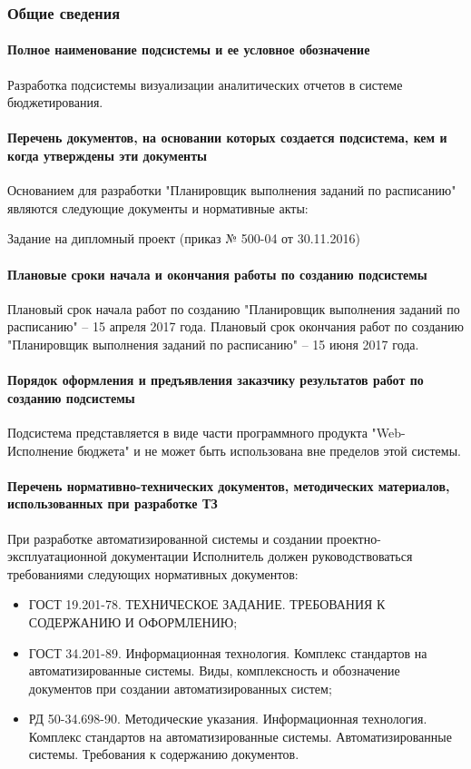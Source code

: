 \documentclass[a4paper]{extarticle}
\numberwithin{equation}{section}
\begin{document}
\subsubsection{Общие сведения}

\paragraph{Полное наименование подсистемы и ее условное обозначение}
Разработка подсистемы визуализации аналитических отчетов в системе бюджетирования.

\paragraph{Перечень документов, на основании которых создается подсистема, кем и когда утверждены эти документы}
Основанием для разработки "Планировщик выполнения заданий по расписанию" являются следующие документы и нормативные акты:\par
Задание на дипломный проект (приказ № 500-04 от 30.11.2016)

\paragraph{Плановые сроки начала и окончания работы по созданию подсистемы}
Плановый срок начала работ по созданию "Планировщик выполнения заданий по расписанию" – 15 апреля 2017 года. Плановый срок окончания работ по созданию "Планировщик выполнения заданий по расписанию" – 15 июня 2017 года.

\paragraph{Порядок оформления и предъявления заказчику результатов работ по созданию подсистемы}
Подсистема представляется в виде части программного продукта "Web-Исполнение бюджета" и не может быть использована вне пределов этой системы.

\paragraph{Перечень нормативно-технических документов, методических материалов, использованных при разработке ТЗ}
При разработке автоматизированной системы и создании проектно-эксплуатационной документации Исполнитель должен руководствоваться требованиями следующих нормативных документов:
\begin{itemize}
  \item ГОСТ 19.201-78. ТЕХНИЧЕСКОЕ ЗАДАНИЕ. ТРЕБОВАНИЯ К СОДЕРЖАНИЮ И ОФОРМЛЕНИЮ;
  \item ГОСТ 34.201-89. Информационная технология. Комплекс стандартов на автоматизированные системы. Виды, комплексность и обозначение документов при создании автоматизированных систем;
  \item РД 50-34.698-90. Методические указания. Информационная технология. Комплекс стандартов на автоматизированные системы. Автоматизированные системы. Требования к содержанию документов.
\end{itemize}
\end{document}
